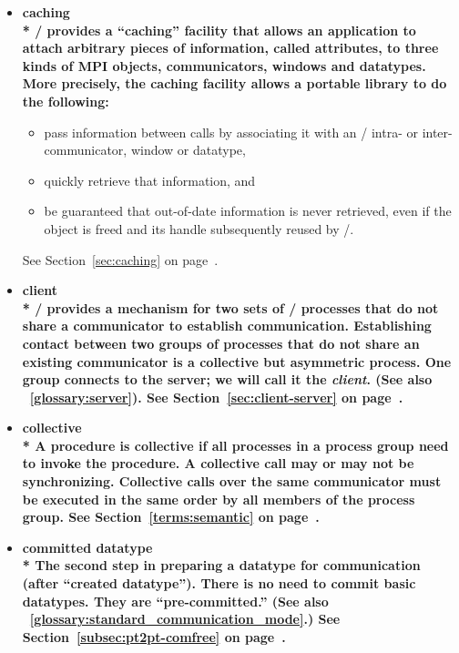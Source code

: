 \begin{itemize}
\label{glossary:caching}
\item \bf{ caching} \\*
\MPI/ provides a ``caching'' facility that allows an application to
attach arbitrary pieces of information, called {\bf attributes}, to
three kinds of MPI objects, communicators, windows and datatypes.
More precisely, the caching
facility allows a portable library to do the following:
\begin{itemize}
\item
  pass information between calls by associating it
  with an \MPI/ intra- or in\-ter-\-com\-mun\-i\-ca\-tor, 
window or datatype,
\item quickly retrieve that information, and
\item
 be guaranteed that out-of-date information is never retrieved, even if
 the object is freed and its handle subsequently reused by \MPI/.
\end{itemize}
See Section~\ref{sec:caching} on page~\pageref{sec:caching}.

\label{glossary:client}
\item \bf{ client} \\*
 \MPI/ provides a mechanism for two sets of \MPI/  processes that do not share a communicator
to establish communication.
Establishing contact between two groups of processes that do not share an
existing communicator is a collective but asymmetric process.  One group connects to the
server; we will call it the \emph{client}. 
(See also ~\ref{glossary:server}). 
See Section~\ref{sec:client-server} on page~\pageref{sec:client-server}.

\label{glossary:collective}
\item \bf{ collective} \\*
A procedure is collective if all processes in a process group need to invoke the procedure.  A
collective call may or may not be synchronizing.
Collective calls over the same communicator
must be executed in the same order by all members of the process
group.
See Section~\ref{terms:semantic} on page~\pageref{terms:semantic}.

\label{glossary:committed_datatype}
\item \bf{ committed datatype} \\*
The second step in preparing a datatype for communication (after ``created datatype'').
There is no need to commit basic datatypes. They are ``pre-committed.''
(See also ~\ref{glossary:standard_communication_mode}.)
See Section~\ref{subsec:pt2pt-comfree} on page~\pageref{subsec:pt2pt-comfree}.


\end{itemize}
